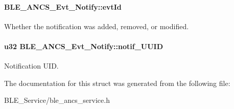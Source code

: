 \paragraph[{\texorpdfstring{evt\+Id}{evtId}}]{ B\+L\+E\+\_\+\+A\+N\+C\+S\+\_\+\+Evt\+\_\+\+Notify\+::evt\+Id}\hypertarget{struct_b_l_e___a_n_c_s___evt___notify_ab305cddebbb9a48f8b1c801e8061f062}{}\label{struct_b_l_e___a_n_c_s___evt___notify_ab305cddebbb9a48f8b1c801e8061f062}
Whether the notification was added, removed, or modified. 
\paragraph[{\texorpdfstring{notif\+\_\+\+U\+U\+ID}{notif_UUID}}]{\setlength{\rightskip}{0pt plus 5cm}u32 B\+L\+E\+\_\+\+A\+N\+C\+S\+\_\+\+Evt\+\_\+\+Notify\+::notif\+\_\+\+U\+U\+ID}\hypertarget{struct_b_l_e___a_n_c_s___evt___notify_aa89f38914f91f6dcafffde27ef802ae1}{}\label{struct_b_l_e___a_n_c_s___evt___notify_aa89f38914f91f6dcafffde27ef802ae1}
Notification U\+ID. 

The documentation for this struct was generated from the following file\+:\begin{DoxyCompactItemize}
\item 
B\+L\+E\+\_\+\+Service/ble\+\_\+ancs\+\_\+service.\+h\end{DoxyCompactItemize}

